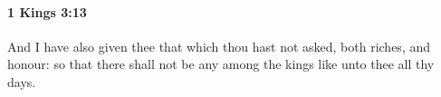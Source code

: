 
		\paragraph{1 Kings 3:13} %
			\label{1KINGS-3-13}

			And I have also given thee that which thou hast not asked, both riches, and honour: so that there shall not be any among the kings like unto thee all thy days.


